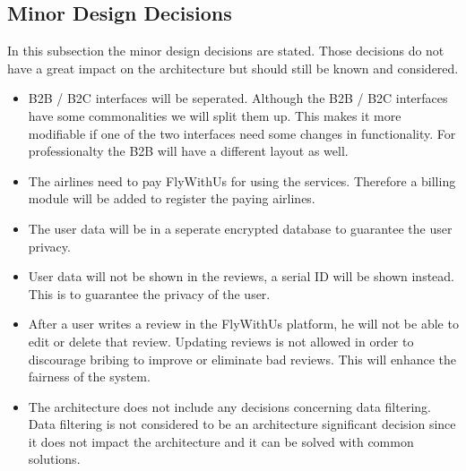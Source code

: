 \subsection{Minor Design Decisions}
\label{sec:minor-dd}
In this subsection the minor design decisions are stated. Those decisions do not have a great impact on the architecture but should still be known and considered. 

\begin{itemize}
\item B2B / B2C interfaces will be seperated. Although the B2B / B2C interfaces have some commonalities we will split them up. This makes it more modifiable if one of the two interfaces need some changes in functionality.  For professionalty the B2B will have a different layout as well.

\item The airlines need to pay FlyWithUs for using the services. Therefore a billing module will be added to register the paying airlines. 

\item The user data will be in a seperate encrypted database to guarantee the user privacy.

\item User data will not be shown in the reviews, a serial ID will be shown instead. This is to guarantee the privacy of the user.

\item After a user writes a review in the FlyWithUs platform, he will not be able to edit or delete that review. Updating reviews is not allowed in order to discourage bribing to improve or eliminate bad reviews. This will enhance the fairness of the system.

\item The architecture does not include any decisions concerning data filtering. Data filtering is not considered to be an architecture significant decision since it does not impact the architecture and it can be solved with common solutions.
\end{itemize}